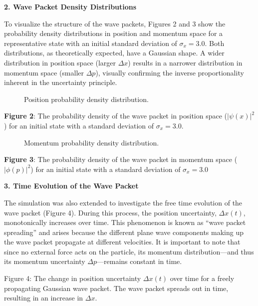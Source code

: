 \textbf{2. Wave Packet Density Distributions}

To visualize the structure of the wave packets, Figures 2 and 3 show the
probability density distributions in position and momentum space for a
representative state with an initial standard deviation of
\(σ_x = 3.0\). Both distributions, as theoretically expected, have a
Gaussian shape. A wider distribution in position space (larger \(Δx\))
results in a narrower distribution in momentum space (smaller \(Δp\)),
visually confirming the inverse proportionality inherent in the
uncertainty principle.

\begin{figure}
\centering
{}
\caption{Position probability density distribution.}
\end{figure}

\textbf{Figure 2}: The probability density of the wave packet in
position space (\(|\psi(x)|^2\)) for an initial state with a standard
deviation of \(σ_x = 3.0\).

\begin{figure}
\centering
{}
\caption{Momentum probability density distribution.}
\end{figure}

\textbf{Figure 3}: The probability density of the wave packet in
momentum space (\(|\phi(p)|^2\)) for an initial state with a standard
deviation of \(σ_x = 3.0\)

\textbf{3. Time Evolution of the Wave Packet}

The simulation was also extended to investigate the free time evolution
of the wave packet (Figure 4). During this process, the position
uncertainty, \(Δx(t)\), monotonically increases over time. This
phenomenon is known as ``wave packet spreading'' and arises because the
different plane wave components making up the wave packet propagate at
different velocities. It is important to note that since no external
force acts on the particle, its momentum distribution---and thus its
momentum uncertainty \(Δp\)---remains constant in time.

Figure 4: The change in position uncertainty \(Δx(t)\) over time for a
freely propagating Gaussian wave packet. The wave packet spreads out in
time, resulting in an increase in \(Δx\).

